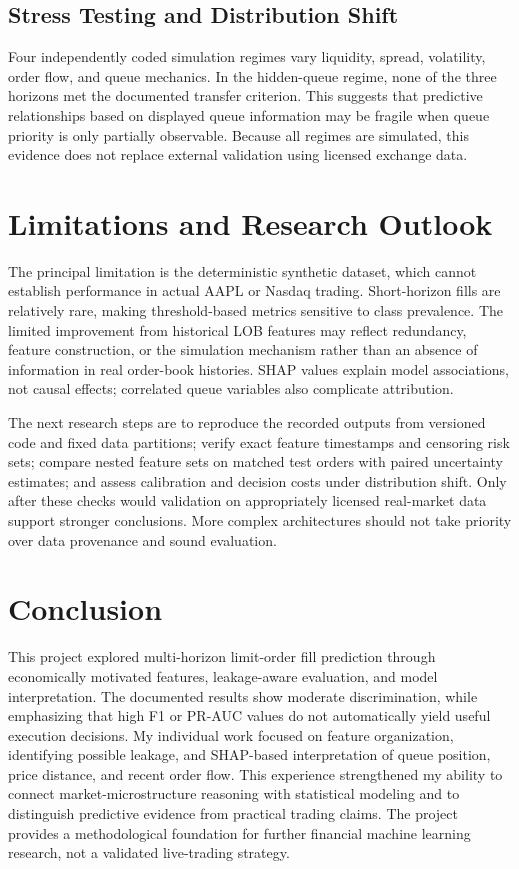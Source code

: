 \documentclass[11pt,a4paper]{article}
\begin{document}
\subsection{Stress Testing and Distribution Shift}
Four independently coded simulation regimes vary liquidity, spread, volatility, order flow, and queue mechanics. In the hidden-queue regime, none of the three horizons met the documented transfer criterion. This suggests that predictive relationships based on displayed queue information may be fragile when queue priority is only partially observable. Because all regimes are simulated, this evidence does not replace external validation using licensed exchange data.

\section{Limitations and Research Outlook}
The principal limitation is the deterministic synthetic dataset, which cannot establish performance in actual AAPL or Nasdaq trading. Short-horizon fills are relatively rare, making threshold-based metrics sensitive to class prevalence. The limited improvement from historical LOB features may reflect redundancy, feature construction, or the simulation mechanism rather than an absence of information in real order-book histories. SHAP values explain model associations, not causal effects; correlated queue variables also complicate attribution.

The next research steps are to reproduce the recorded outputs from versioned code and fixed data partitions; verify exact feature timestamps and censoring risk sets; compare nested feature sets on matched test orders with paired uncertainty estimates; and assess calibration and decision costs under distribution shift. Only after these checks would validation on appropriately licensed real-market data support stronger conclusions. More complex architectures should not take priority over data provenance and sound evaluation.

\section{Conclusion}
This project explored multi-horizon limit-order fill prediction through economically motivated features, leakage-aware evaluation, and model interpretation. The documented results show moderate discrimination, while emphasizing that high F1 or PR-AUC values do not automatically yield useful execution decisions. My individual work focused on feature organization, identifying possible leakage, and SHAP-based interpretation of queue position, price distance, and recent order flow. This experience strengthened my ability to connect market-microstructure reasoning with statistical modeling and to distinguish predictive evidence from practical trading claims. The project provides a methodological foundation for further financial machine learning research, not a validated live-trading strategy.
\end{document}
